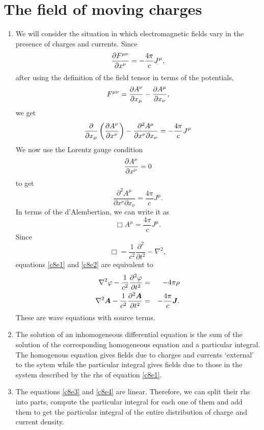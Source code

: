\chapter{The field of moving charges}\label{c8}
\begin{enumerate}
\item We will consider the situation in which electromagnetic fields vary in the
presence of charges and currents. Since
\[
\frac{\partial{F^{\mu\nu}}}{\partial{x^\nu}} = -\frac{4\pi}{c}J^\mu,
\]
after using the definition of the field tensor in terms of the potentials,
\[
F^{\mu\nu} = \frac{\partial{A^\nu}}{\partial{x_\mu}} - \frac{\partial{A^\mu}}{\partial{x_\nu}},
\]
we get
\[
\frac{\partial}{\partial x_\mu}\left(\frac{\partial{A^\nu}}{\partial{x^\nu}}\right) - 
\frac{\partial^2 A^\mu}{\partial x^\nu \partial x_\nu} = -\frac{4\pi}{c}J^\mu
\]
We now use the Lorentz gauge condition
\[
\frac{\partial{A^\nu}}{\partial{x^\nu}} = 0
\]
to get
\begin{equation}\label{c8e1}
\frac{\partial^2 A^\mu}{\partial x^\nu \partial x_\nu} = \frac{4\pi}{c}J^\mu.
\end{equation}
In terms of the d'Alembertian, we can write it as
\begin{equation}\label{c8e2}
\Box A^\mu = \frac{4\pi}{c}J^\mu.
\end{equation}
Since
\[
\Box = \frac{1}{c^2}\frac{\partial^2}{\partial t^2} - \nabla^2,
\]
equations \eqref{c8e1} and \eqref{c8e2} are equivalent to
\begin{eqnarray}
\nabla^2\varphi - \frac{1}{c^2}\frac{\partial^2{\varphi}}{\partial{t}^2} &=& -4\pi\rho \label{c8e3} \\
\nabla^2\bm{A} - \frac{1}{c^2}\frac{\partial^2{\bm{A}}}{\partial{t}^2} &=& 
-\frac{4\pi}{c}\bm{J}. \label{c8e4}
\end{eqnarray}
These are wave equations with source terms.

\item The solution of an inhomogeneous differential equation is the sum of the
solution of the corresponding homogeneous equation and a particular integral.
The homogenous equation gives fields due to charges and currents `external' to
the sytem while the particular integral gives fields due to those in the system
described by the rhs of equation \eqref{c8e1}. 

\item The equations \eqref{c8e3} and \eqref{c8e4} are linear. Therefore, we can
split their rhs into parts, compute the particular integral for each one of them
and add them to get the particular integral of the entire distribution of charge
and current density.


\end{enumerate}
